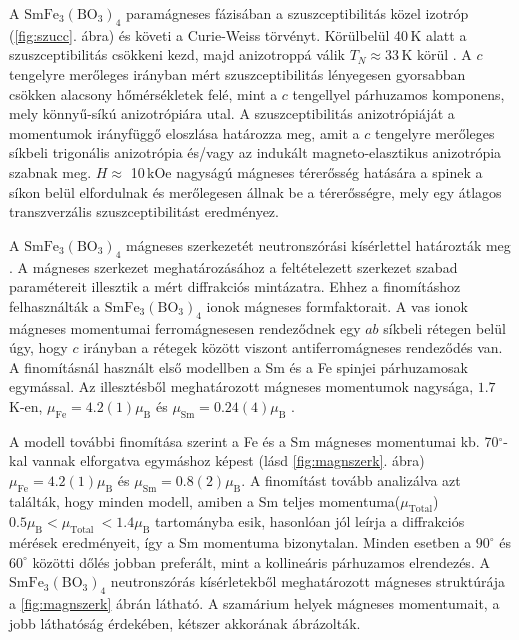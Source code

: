 \documentclass[a4paper,12pt]{article}
\numberwithin{equation}{section}
\begin{document}
A $\mathrm{SmFe_3(BO_3)_4}$ paramágneses fázisában a szuszceptibilitás közel izotróp (\ref{fig:szucc}. ábra) és követi a Curie-Weiss törvényt. Körülbelül 40\,K alatt a szuszceptibilitás csökkeni kezd, majd anizotroppá válik $T_N\approx33\,\mathrm{K}$ körül \cite{2010_JETP}. A $c$ tengelyre merőleges irányban mért szuszceptibilitás lényegesen gyorsabban csökken alacsony hőmérsékletek felé, mint a $c$ tengellyel párhuzamos komponens, mely könnyű-síkú anizotrópiára utal. A szuszceptibilitás anizotrópiáját a momentumok irányfüggő eloszlása határozza meg, amit a $c$ tengelyre merőleges síkbeli trigonális anizotrópia és/vagy az  indukált magneto-elasztikus anizotrópia szabnak meg. $H\approx$ 10\,kOe nagyságú mágneses térerősség hatására a spinek a síkon belül elfordulnak és merőlegesen állnak be a térerősségre, mely egy átlagos transzverzális szuszceptibilitást eredményez. 

A  ${\mathrm{SmFe_3(BO_3)_4}}$ mágneses szerkezetét neutronszórási kísérlettel határozták meg \cite{2012_JPhys}. A mágneses szerkezet meghatározásához a feltételezett szerkezet szabad paramétereit illesztik a mért diffrakciós mintázatra. Ehhez a finomításhoz felhasználták a ${\mathrm{SmFe_3(BO_3)_4}}$ ionok  mágneses formfaktorait. A vas ionok mágneses momentumai ferromágnesesen rendeződnek egy $ab$ síkbeli rétegen belül úgy, hogy $c$ irányban a rétegek között viszont antiferromágneses rendeződés van. A finomításnál használt első modellben a Sm és a Fe spinjei párhuzamosak egymással. Az illesztésből meghatározott mágneses momentumok nagysága,   $1.7 $ K-en, $\mu_{\mathrm{Fe}}=4.2(1) \mu_{\mathrm{B}}$ és $\mu_{\mathrm{Sm}}=0.24(4) \mu_{\mathrm{B}}$ \cite{2012_JPhys}. 

A modell további finomítása szerint a Fe és a Sm mágneses momentumai kb. 70$^\circ$-kal vannak elforgatva egymáshoz képest (lásd \ref{fig:magnszerk}. ábra) $\mu_{\mathrm{Fe}}=4.2(1) \mu_{\mathrm{B}}$ és $\mu_{\mathrm{Sm}}=0.8(2) \mu_{\mathrm{B}}$. A finomítást tovább analizálva azt találták, hogy minden modell, amiben a Sm teljes momentuma($\mu_{\mathrm{Total }}$) $0.5 \mu_{\mathrm{B}}<\mu_{\text {Total }}<1.4 \mu_{\mathrm{B}}$ tartományba esik, hasonlóan jól leírja a diffrakciós mérések eredményeit, így a Sm momentuma bizonytalan. Minden esetben a $90^\circ$ és $60^\circ$ közötti dőlés jobban preferált, mint a kollineáris párhuzamos elrendezés. A ${\mathrm{SmFe_3(BO_3)_4}}$ neutronszórás kísérletekből meghatározott mágneses struktúrája a \ref{fig:magnszerk} ábrán látható. A szamárium helyek mágneses momentumait, a jobb láthatóság érdekében, kétszer akkorának ábrázolták.
\end{document}
